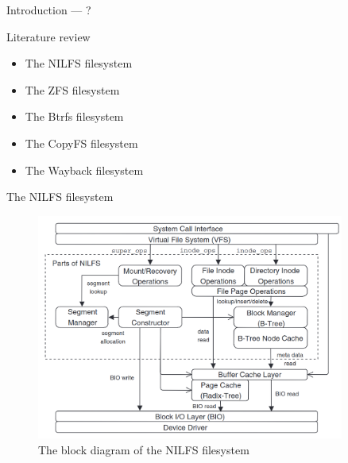 \documentclass[xcolor=table]{beamer}
\begin{document}
	\begin{frame}{Introduction --- ?}
			
	\end{frame}

	\begin{frame}{Literature review}
		\begin{itemize}
			\item The NILFS filesystem
			\item The ZFS filesystem
			\item The Btrfs filesystem
			\item The CopyFS filesystem
			\item The Wayback filesystem
		\end{itemize}	
	\end{frame}

	\begin{frame}{The NILFS filesystem}
		\begin{figure}
			\centering

			\includegraphics[width=0.9\textwidth]{media/nilfs.png}
			\caption{The block diagram of the NILFS filesystem }
			\label{fig:nifls}
		\end{figure}	
	\end{frame}
\end{document}
